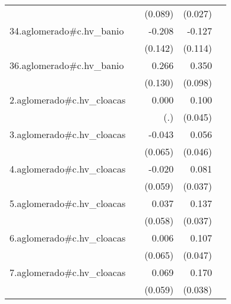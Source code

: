 {\begin{longtable}{l*{4}{D{.}{.}{-1}}}
            &                     &     (0.089)         &     (0.027)         &                     \\
\addlinespace
34.aglomerado#c.hv\_banio&                     &      -0.208         &      -0.127         &                     \\
            &                     &     (0.142)         &     (0.114)         &                     \\
\addlinespace
36.aglomerado#c.hv\_banio&                     &       0.266\sym{*}  &       0.350\sym{***}&                     \\
            &                     &     (0.130)         &     (0.098)         &                     \\
\addlinespace
2.aglomerado#c.hv\_cloacas&                     &       0.000         &       0.100\sym{*}  &                     \\
            &                     &         (.)         &     (0.045)         &                     \\
\addlinespace
3.aglomerado#c.hv\_cloacas&                     &      -0.043         &       0.056         &                     \\
            &                     &     (0.065)         &     (0.046)         &                     \\
\addlinespace
4.aglomerado#c.hv\_cloacas&                     &      -0.020         &       0.081\sym{*}  &                     \\
            &                     &     (0.059)         &     (0.037)         &                     \\
\addlinespace
5.aglomerado#c.hv\_cloacas&                     &       0.037         &       0.137\sym{***}&                     \\
            &                     &     (0.058)         &     (0.037)         &                     \\
\addlinespace
6.aglomerado#c.hv\_cloacas&                     &       0.006         &       0.107\sym{*}  &                     \\
            &                     &     (0.065)         &     (0.047)         &                     \\
\addlinespace
7.aglomerado#c.hv\_cloacas&                     &       0.069         &       0.170\sym{***}&                     \\
            &                     &     (0.059)         &     (0.038)         &                     \\

\end{longtable}}
